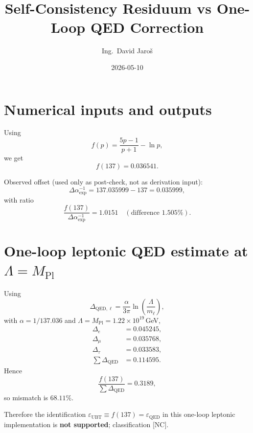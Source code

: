 \documentclass[12pt,a4paper]{article}
\title{Self-Consistency Residuum vs One-Loop QED Correction}
\author{Ing.\ David Jaro\v{s}}
\date{2026-05-10}
\begin{document}
  \maketitle
\fi

\section{Numerical inputs and outputs}

Using
\begin{equation}
f(p)=\frac{5p-1}{p+1}-\ln p,
\end{equation}
we get
\begin{equation}
f(137)=0.036541.
\end{equation}

Observed offset (used only as post-check, not as derivation input):
\begin{equation}
\Delta\alpha^{-1}_{\mathrm{exp}}=137.035999-137=0.035999,
\end{equation}
with ratio
\begin{equation}
\frac{f(137)}{\Delta\alpha^{-1}_{\mathrm{exp}}}=1.0151
\quad(\text{difference }1.505\%).
\end{equation}

\section{One-loop leptonic QED estimate at $\Lambda=M_{\mathrm{Pl}}$}

Using
\begin{equation}
\Delta_{\mathrm{QED},\ell}=\frac{\alpha}{3\pi}\ln\!\left(\frac{\Lambda}{m_\ell}\right),
\end{equation}
with $\alpha=1/137.036$ and $\Lambda=M_{\mathrm{Pl}}=1.22\times10^{19}\,$GeV,
\begin{align}
\Delta_e &= 0.045245,\\
\Delta_\mu &= 0.035768,\\
\Delta_\tau &= 0.033583,\\
\sum\Delta_{\mathrm{QED}} &= 0.114595.
\end{align}
Hence
\begin{equation}
\frac{f(137)}{\sum\Delta_{\mathrm{QED}}}=0.3189,
\end{equation}
so mismatch is $68.11\%$.

Therefore the identification
$\varepsilon_{\mathrm{UBT}}\equiv f(137)=\varepsilon_{\mathrm{QED}}$
in this one-loop leptonic implementation is \textbf{not supported}; classification [NC].
\end{document}
